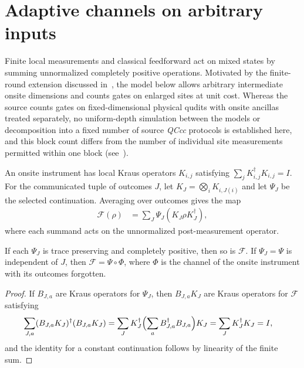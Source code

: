 \section{Adaptive channels on arbitrary inputs}

Finite local measurements and classical feedforward act on mixed states by
summing unnormalized completely positive operations. Motivated by the
finite-round extension discussed in~\cite[paragraph
    ``State transformations with QC and LOCC'']{Piroli2021LOCC}, the model
below allows arbitrary intermediate onsite dimensions and counts gates on
enlarged sites at unit cost. Whereas the source counts gates on
fixed-dimensional physical qudits with onsite ancillas treated separately,
no uniform-depth simulation between the models or decomposition into a
fixed number of source \textit{QCcc} protocols is established here, and
this block count differs from the number of individual site measurements
permitted within one block
(see~\cite{gap:psc21_adaptive_channel_round_scope}).

\begin{definition}
    \label{def:qc_onsite_feedforward}
    \leanok
    An onsite instrument has local Kraus operators $K_{i,j}$ satisfying
    $\sum_jK_{i,j}^{\dagger}K_{i,j}=I$. For the communicated tuple of outcomes
    $J$, let $K_J=\bigotimes_iK_{i,J(i)}$ and let $\Psi_J$ be the selected
    continuation. Averaging over outcomes gives the map
    \begin{align}
        \mathcal F(\rho) & =\sum_J\Psi_J(K_J\rho K_J^{\dagger}),
        \label{eq:qc_onsite_feedforward}
    \end{align}
    where each summand acts on the unnormalized post-measurement operator.
\end{definition}

\begin{lemma}
    \label{thm:qc_onsite_feedforward_cptp}
    \leanok
    If each $\Psi_J$ is trace preserving and completely positive, then so is
    $\mathcal F$. If $\Psi_J=\Psi$ is independent of $J$, then
    $\mathcal F=\Psi\circ\Phi$, where $\Phi$ is the channel of the onsite
    instrument with its outcomes forgotten.
\end{lemma}
\begin{proof}
    \leanok
    If $B_{J,a}$ are Kraus operators for $\Psi_J$, then $B_{J,a}K_J$ are
    Kraus operators for $\mathcal F$ satisfying
    \begin{align}
        \sum_{J,a}(B_{J,a}K_J)^{\dagger}(B_{J,a}K_J)
         & =\sum_JK_J^{\dagger}\Bigl(\sum_aB_{J,a}^{\dagger}B_{J,a}\Bigr)K_J
        =\sum_JK_J^{\dagger}K_J=I, \notag
    \end{align}
    and the identity for a constant continuation follows by linearity of the
    finite sum.
\end{proof}

